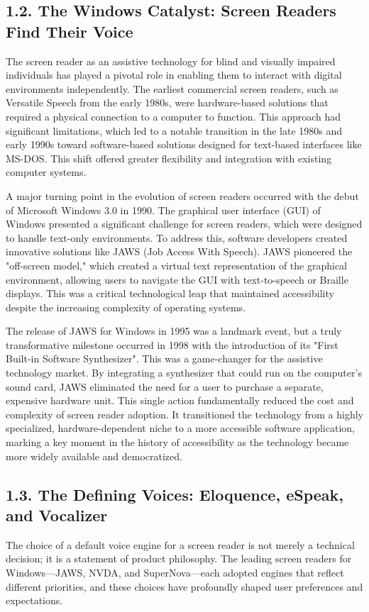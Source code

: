 \subsection{1.2. The Windows Catalyst: Screen Readers Find Their Voice}
The screen reader as an assistive technology for blind and visually
impaired individuals has played a pivotal role in enabling them to
interact with digital environments independently.\supercite{3} The earliest
commercial screen readers, such as Versatile Speech from the early
1980s, were hardware-based solutions that required a physical connection
to a computer to function.\supercite{3} This approach had significant limitations,
which led to a notable transition in the late 1980s and early 1990s
toward software-based solutions designed for text-based interfaces like
MS-DOS.\supercite{3} This shift offered greater flexibility and integration with
existing computer systems.

A major turning point in the evolution of screen readers occurred with
the debut of Microsoft Windows 3.0 in 1990.\supercite{3} The graphical user
interface (GUI) of Windows presented a significant challenge for screen
readers, which were designed to handle text-only environments. To
address this, software developers created innovative solutions like JAWS
(Job Access With Speech).\supercite{3} JAWS pioneered the "off-screen model,"
which created a virtual text representation of the graphical
environment, allowing users to navigate the GUI with text-to-speech or
Braille displays.\supercite{3} This was a critical technological leap that
maintained accessibility despite the increasing complexity of operating
systems.

The release of JAWS for Windows in 1995 was a landmark event, but a
truly transformative milestone occurred in 1998 with the introduction of
its "First Built-in Software Synthesizer".\supercite{4} This was a game-changer
for the assistive technology market. By integrating a synthesizer that
could run on the computer's sound card, JAWS eliminated the need for a
user to purchase a separate, expensive hardware unit.\supercite{4} This single
action fundamentally reduced the cost and complexity of screen reader
adoption. It transitioned the technology from a highly specialized,
hardware-dependent niche to a more accessible software application,
marking a key moment in the history of accessibility as the technology
became more widely available and democratized.

\subsection{1.3. The Defining Voices: Eloquence, eSpeak, and Vocalizer}
The choice of a default voice engine for a screen reader is not merely a
technical decision; it is a statement of product philosophy. The leading
screen readers for Windows---JAWS, NVDA, and SuperNova---each adopted
engines that reflect different priorities, and these choices have
profoundly shaped user preferences and expectations.

